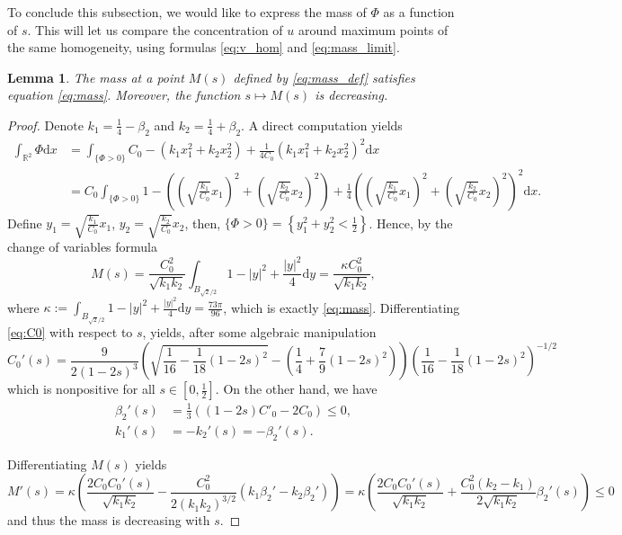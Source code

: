 \documentclass[10pt,a4paper]{article}
\newcommand{\RR}{\mathbb{R}}
\newtheorem{lem}[thm]{Lemma}
\numberwithin{equation}{section}
\begin{document}
To conclude this subsection, we would like to express the mass of $\Phi$ as a function of $s$. This will let us compare the concentration of $u$ around maximum points of the same homogeneity, using formulas \eqref{eq:v_hom} and \eqref{eq:mass_limit}.

\begin{lem}
	The mass at a point $M(s)$ defined by \eqref{eq:mass_def} satisfies equation \eqref{eq:mass}. Moreover, the function $s\mapsto M(s)$ is decreasing.
\end{lem}
\begin{proof}
Denote $k_1 = \frac{1}{4} - \beta_2$ and $k_2 = \frac{1}{4} + \beta_2$. A direct computation yields
\begin{align*}
	\int_{\RR^{2}} \Phi \mathrm{d}x &= \int_{\{\Phi>0\}} C_0 - \left( k_1x_1^{2} + k_2 x_2^{2} \right) + \frac{1}{4C_0}\left( k_1x_1^{2} + k_2 x_2^{2} \right)^{2} \mathrm{d}x \\
				     &= C_0 \int_{\{\Phi>0\}} 1 - \left( \left( \sqrt{\frac{k_1}{C_0}} x_1 \right)^{2} + \left( \sqrt{\frac{k_2}{C_0}} x_2 \right)^{2} \right) + \frac{1}{4}\left( \left( \sqrt{\frac{k_1}{C_0}} x_1 \right)^{2} + \left( \sqrt{\frac{k_2}{C_0}} x_2 \right)^{2} \right)^{2} \mathrm{d}x.
\end{align*}
Define $y_1 = \sqrt{\frac{k_1}{C_0}} x_1$,	$ y_2 = \sqrt{\frac{k_2}{C_0}} x_2$, then, $\{\Phi > 0\} = \left\{ y_1^{2}+ y_2^{2} < \frac{1}{2} \right\} $. Hence, by the change of variables formula
\[
	M(s) = \frac{C_0^{2}}{\sqrt{k_1 k_2}} \int_{B_{\sqrt{2}/2}} 1 - |y|^{2} + \frac{|y|^{2}}{4} \mathrm{d}y = \frac{\kappa C_0^{2}}{\sqrt{k_1 k_2}},  
\]
where $\kappa := \int_{B_{\sqrt{2}/2}} 1 - |y|^{2} + \frac{|y|^{2}}{4} \mathrm{d}y = \frac{73\pi}{96}$, which is exactly \eqref{eq:mass}. Differentiating \eqref{eq:C0} with respect to $s$, yields, after some algebraic manipulation
\[
	C_0'(s) = \frac{9}{2(1-2s)^{3}} \left( \sqrt{\frac{1}{16} - \frac{1}{18} (1-2s)^{2}} - \left( \frac{1}{4} + \frac{7}{9}(1-2s)^{2} \right) \right) \left( \frac{1}{16} - \frac{1}{18}	(1-2s)^{2} \right)^{-1/2} 
\]
which is nonpositive for all $s \in [0, \frac{1}{2}]$. On the other hand, we have 
\begin{align*}
	\beta_2'(s) &= \frac{1}{3} \left( (1-2s) C'_0 -2C_0 \right) \leq 0, \\
	k_1'(s) &= -k_2'(s) = -\beta_2'(s). 
\end{align*}

Differentiating $ M(s) $ yields
\[
M'(s) = \kappa \left( \frac{2C_0 C_0'(s)}{\sqrt{k_1 k_2}} - \frac{C_0^{2}}{2 \left( k_1k_2 \right)^{3/2}} \left( k_1 \beta_2' - k_2 \beta_2' \right)  \right) =  \kappa \left( \frac{2C_0 C_0'(s)}{\sqrt{k_1 k_2}} + \frac{C_0^{2} (k_2 - k_1)}{2 \sqrt{k_1k_2}} \beta_2'(s)  \right) \leq 0
\]
and thus the mass is decreasing with $s$.
	
\end{proof}
\end{document}
